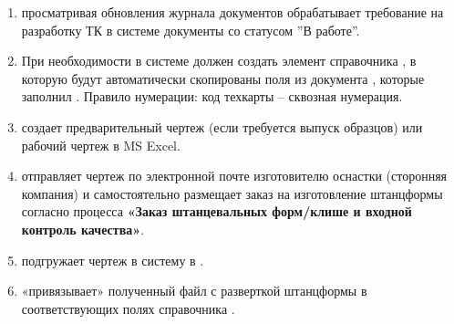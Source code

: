 \begin{enumerate}

\item \tehnolog просматривая обновления журнала документов  обрабатывает требование на разработку ТК в системе \gofro документы со статусом ''В работе''.
\item	При необходимости \tehnolog в системе \gofro должен создать элемент справочника , в которую будут автоматически скопированы поля из документа , которые заполнил \manager. Правило нумерации: код техкарты – сквозная нумерация. 




\item \constructor создает предварительный чертеж (если требуется выпуск образцов) или рабочий чертеж в MS Excel.



\item \constructor 
отправляет чертеж по электронной почте изготовителю оснастки (сторонняя компания) и самостоятельно размещает заказ на изготовление штанцформы согласно процесса \textbf{«Заказ штанцевальных форм/клише и входной контроль качества»}. 

\item \tehnolog подгружает чертеж в систему \gofro в .

\item \tehnolog «привязывает» полученный файл с разверткой штанцформы в соответствующих полях справочника .


\end{enumerate}
